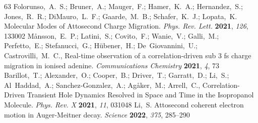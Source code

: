 \documentclass[journal=jacsat,manuscript=article]{achemso}
\begin{document}
\begin{mcitethebibliography}{63}
\mciteBstWouldAddEndPuncttrue
\mciteSetBstMidEndSepPunct{\mcitedefaultmidpunct}
{\mcitedefaultendpunct}{\mcitedefaultseppunct}\relax
\EndOfBibitem
{}
Folorunso,~A.~S.; Bruner,~A.; Mauger,~F.; Hamer,~K.~A.; Hernandez,~S.;
  Jones,~R.~R.; DiMauro,~L.~F.; Gaarde,~M.~B.; Schafer,~K.~J.; Lopata,~K.
  Molecular Modes of Attosecond Charge Migration. \emph{Phys. Rev. Lett.}
  \textbf{2021}, \emph{126}, 133002\relax
\mciteBstWouldAddEndPuncttrue
\mciteSetBstMidEndSepPunct{\mcitedefaultmidpunct}
{\mcitedefaultendpunct}{\mcitedefaultseppunct}\relax
\EndOfBibitem
{}
M{\aa}nsson,~E.~P.; Latini,~S.; Covito,~F.; Wanie,~V.; Galli,~M.; Perfetto,~E.;
  Stefanucci,~G.; H{\"u}bener,~H.; De~Giovannini,~U.; Castrovilli,~M.~C.,
    Real-time observation of a correlation-driven sub 3 fs charge
  migration in ionised adenine. \emph{Communications Chemistry} \textbf{2021},
  \emph{4}, 73\relax
\mciteBstWouldAddEndPuncttrue
\mciteSetBstMidEndSepPunct{\mcitedefaultmidpunct}
{\mcitedefaultendpunct}{\mcitedefaultseppunct}\relax
\EndOfBibitem
{}
Barillot,~T.; Alexander,~O.; Cooper,~B.; Driver,~T.; Garratt,~D.; Li,~S.;
  Al~Haddad,~A.; Sanchez-Gonzalez,~A.; Ag\aa{}ker,~M.; Arrell,~C.,
    Correlation-Driven Transient Hole Dynamics Resolved in Space
  and Time in the Isopropanol Molecule. \emph{Phys. Rev. X} \textbf{2021},
  \emph{11}, 031048\relax
\mciteBstWouldAddEndPuncttrue
\mciteSetBstMidEndSepPunct{\mcitedefaultmidpunct}
{\mcitedefaultendpunct}{\mcitedefaultseppunct}\relax
\EndOfBibitem
{}
Li,~S.   Attosecond coherent electron motion in Auger-Meitner
  decay. \emph{Science} \textbf{2022}, \emph{375}, 285--290\relax
\mciteBstWouldAddEndPuncttrue
\mciteSetBstMidEndSepPunct{\mcitedefaultmidpunct}

\end{mcitethebibliography}
\end{document}
